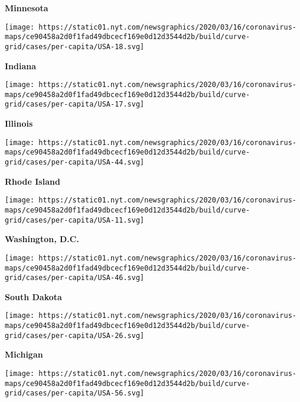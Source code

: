 \textbf{Minnesota}

\href{https://www.nytimes.com/interactive/2020/us/indiana-coronavirus-cases.html}{}

\texttt{[image: https://static01.nyt.com/newsgraphics/2020/03/16/coronavirus-maps/ce90458a2d0f1fad49dbcecf169e0d12d3544d2b/build/curve-grid/cases/per-capita/USA-18.svg]}

\textbf{Indiana}

\href{https://www.nytimes.com/interactive/2020/us/illinois-coronavirus-cases.html}{}

\texttt{[image: https://static01.nyt.com/newsgraphics/2020/03/16/coronavirus-maps/ce90458a2d0f1fad49dbcecf169e0d12d3544d2b/build/curve-grid/cases/per-capita/USA-17.svg]}

\textbf{Illinois}

\href{https://www.nytimes.com/interactive/2020/us/rhode-island-coronavirus-cases.html}{}

\texttt{[image: https://static01.nyt.com/newsgraphics/2020/03/16/coronavirus-maps/ce90458a2d0f1fad49dbcecf169e0d12d3544d2b/build/curve-grid/cases/per-capita/USA-44.svg]}

\textbf{Rhode Island}

\href{https://www.nytimes.com/interactive/2020/us/washington-dc-coronavirus-cases.html}{}

\texttt{[image: https://static01.nyt.com/newsgraphics/2020/03/16/coronavirus-maps/ce90458a2d0f1fad49dbcecf169e0d12d3544d2b/build/curve-grid/cases/per-capita/USA-11.svg]}

\textbf{Washington, D.C.}

\href{https://www.nytimes.com/interactive/2020/us/south-dakota-coronavirus-cases.html}{}

\texttt{[image: https://static01.nyt.com/newsgraphics/2020/03/16/coronavirus-maps/ce90458a2d0f1fad49dbcecf169e0d12d3544d2b/build/curve-grid/cases/per-capita/USA-46.svg]}

\textbf{South Dakota}

\href{https://www.nytimes.com/interactive/2020/us/michigan-coronavirus-cases.html}{}

\texttt{[image: https://static01.nyt.com/newsgraphics/2020/03/16/coronavirus-maps/ce90458a2d0f1fad49dbcecf169e0d12d3544d2b/build/curve-grid/cases/per-capita/USA-26.svg]}

\textbf{Michigan}

\href{https://www.nytimes.com/interactive/2020/us/wyoming-coronavirus-cases.html}{}

\texttt{[image: https://static01.nyt.com/newsgraphics/2020/03/16/coronavirus-maps/ce90458a2d0f1fad49dbcecf169e0d12d3544d2b/build/curve-grid/cases/per-capita/USA-56.svg]}

